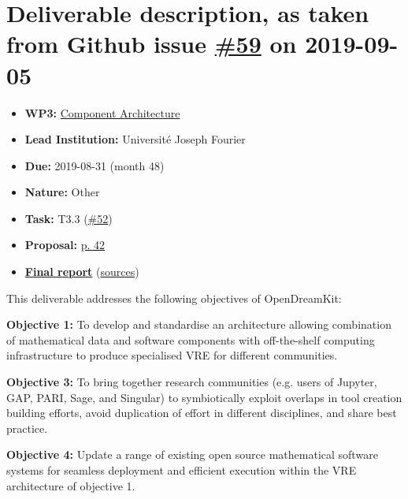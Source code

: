 \hypertarget{deliverable-description-as-taken-from-github-issue-59-on-2019-09-05}{%
\section*{\texorpdfstring{Deliverable description, as taken from Github
issue
\href{https://github.com/OpenDreamKit/OpenDreamKit/issues/59}{\#59} on
2019-09-05}{Deliverable description, as taken from Github issue \#59 on 2019-09-05}}\label{deliverable-description-as-taken-from-github-issue-59-on-2019-09-05}}

\begin{itemize}
\tightlist
\item
  \textbf{WP3:}
  \href{https://github.com/OpenDreamKit/OpenDreamKit/tree/master/WP3}{Component
  Architecture}
\item
  \textbf{Lead Institution:} Université Joseph Fourier
\item
  \textbf{Due:} 2019-08-31 (month 48)
\item
  \textbf{Nature:} Other
\item
  \textbf{Task:} T3.3
  (\href{https://github.com/OpenDreamKit/OpenDreamKit/issues/52}{\#52})
\item
  \textbf{Proposal:}
  \href{https://github.com/OpenDreamKit/OpenDreamKit/raw/master/Proposal/proposal-www.pdf}{p.
  42}
\item
  \textbf{\href{https://github.com/OpenDreamKit/OpenDreamKit/raw/master/WP3/D3.10/report-final.pdf}{Final
  report}}
  (\href{https://github.com/OpenDreamKit/OpenDreamKit/raw/master/WP3/D3.10/}{sources})
\end{itemize}

This deliverable addresses the following objectives of OpenDreamKit:

\textbf{Objective 1:} To develop and standardise an architecture
allowing combination of mathematical data and software components with
off-the-shelf computing infrastructure to produce specialised VRE for
different communities.

\textbf{Objective 3:} To bring together research communities (e.g. users
of Jupyter, GAP, PARI, Sage, and Singular) to symbiotically exploit
overlaps in tool creation building efforts, avoid duplication of effort
in different disciplines, and share best practice.

\textbf{Objective 4:} Update a range of existing open source
mathematical software systems for seamless deployment and efficient
execution within the VRE architecture of objective 1.

